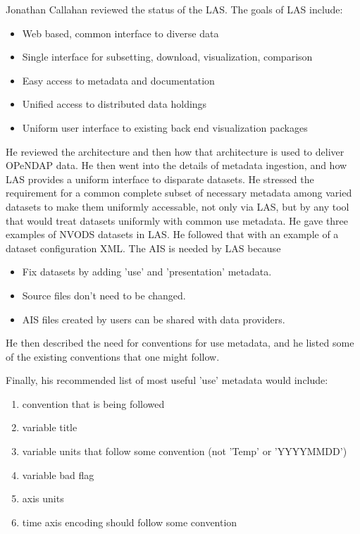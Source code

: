 Jonathan Callahan reviewed the status of the \ac{LAS}.  The goals of 
\ac{LAS} include:

\begin{itemize}
   \item Web based, common interface to diverse data
   \item Single interface for subsetting, download, visualization, comparison
   \item Easy access to metadata and documentation
   \item Unified access to distributed data holdings
   \item Uniform user interface to existing back end visualization packages
\end{itemize}

He reviewed the architecture and then how that architecture is used
to deliver \ac{OPeNDAP} data.  He then went into the details of metadata
ingestion, and how \ac{LAS} provides a uniform interface to disparate
datasets.  He stressed the requirement for a common complete subset
of necessary metadata among varied datasets to make them uniformly
accessable, not only via \ac{LAS}, but by any tool that would treat
datasets uniformly with common use metadata.  He gave three examples
of \ac{NVODS} datasets in \ac{LAS}.  He followed that with an example of
a dataset configuration XML.  The \ac{AIS} is needed by \ac{LAS} because

\begin{itemize}
   \item Fix datasets by adding 'use' and 'presentation' metadata.
   \item Source files don't need to be changed.
   \item \ac{AIS} files created by users can be shared with data providers.
\end{itemize}

He then described the need for conventions for use metadata, and he listed
some of the existing conventions that one might follow.  

Finally, his recommended list of most useful 'use' metadata would include:

\begin{enumerate}
   \item convention that is being followed 
   \item variable title 
   \item variable units that follow some convention (not 'Temp' or 'YYYYMMDD') 
   \item variable bad flag 
   \item axis units 
   \item time axis encoding should follow some convention 
\end{enumerate}

%
%
%
%

